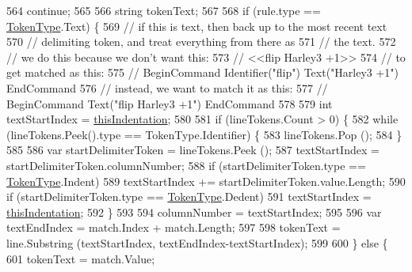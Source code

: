 \begin{DoxyCode}
564                         \textcolor{keywordflow}{continue};
565 
566                     \textcolor{keywordtype}{string} tokenText;
567 
568                     \textcolor{keywordflow}{if} (rule.type == \hyperlink{a00051_a301aa7c866593a5b625a8fc158bbeace}{TokenType}.Text) \{
569                         \textcolor{comment}{// if this is text, then back up to the most recent text}
570                         \textcolor{comment}{// delimiting token, and treat everything from there as}
571                         \textcolor{comment}{// the text.}
572                         \textcolor{comment}{// we do this because we don't want this:}
573                         \textcolor{comment}{//    <<flip Harley3 +1>>}
574                         \textcolor{comment}{// to get matched as this:}
575                         \textcolor{comment}{//    BeginCommand Identifier("flip") Text("Harley3 +1") EndCommand}
576                         \textcolor{comment}{// instead, we want to match it as this:}
577                         \textcolor{comment}{//    BeginCommand Text("flip Harley3 +1") EndCommand}
578 
579                         \textcolor{keywordtype}{int} textStartIndex = \hyperlink{a00348_a0e59365a4aa5811f6495b92a51e23573}{thisIndentation};
580 
581                         \textcolor{keywordflow}{if} (lineTokens.Count > 0) \{
582                             \textcolor{keywordflow}{while} (lineTokens.Peek().type == TokenType.Identifier) \{
583                                 lineTokens.Pop ();
584                             \}
585 
586                             var startDelimiterToken = lineTokens.Peek ();
587                             textStartIndex = startDelimiterToken.columnNumber;
588                             \textcolor{keywordflow}{if} (startDelimiterToken.type == \hyperlink{a00051_a301aa7c866593a5b625a8fc158bbeace}{TokenType}.Indent)
589                                 textStartIndex += startDelimiterToken.value.Length;
590                             \textcolor{keywordflow}{if} (startDelimiterToken.type == \hyperlink{a00051_a301aa7c866593a5b625a8fc158bbeace}{TokenType}.Dedent)
591                                 textStartIndex = \hyperlink{a00348_a0e59365a4aa5811f6495b92a51e23573}{thisIndentation};
592                         \}
593 
594                         columnNumber = textStartIndex;
595 
596                         var textEndIndex = match.Index + match.Length;
597 
598                         tokenText = line.Substring (textStartIndex, textEndIndex-textStartIndex);
599 
600                     \} \textcolor{keywordflow}{else} \{
601                         tokenText = match.Value;

\end{DoxyCode}
